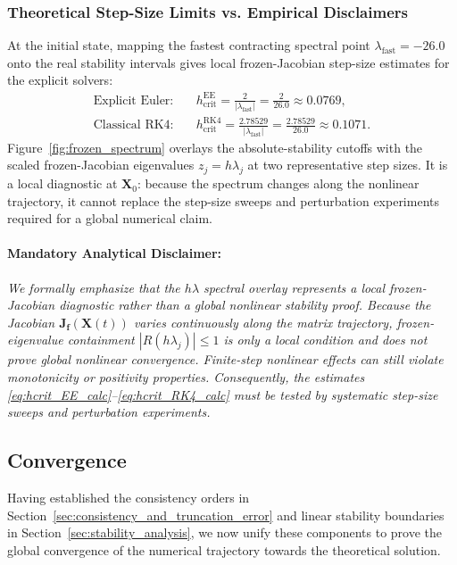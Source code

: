 \documentclass[11pt,a4paper]{article}
\theoremstyle{definition}
\theoremstyle{remark}
\begin{document}
\subsubsection{Theoretical Step-Size Limits vs. Empirical Disclaimers}
At the initial state, mapping the fastest contracting spectral point $\lambda_{\mathrm{fast}}=-26.0$ onto the real stability intervals gives local frozen-Jacobian step-size estimates for the explicit solvers:
\begin{align}
\text{Explicit Euler:} \quad & h_{\mathrm{crit}}^{\mathrm{EE}} = \frac{2}{|\lambda_{\mathrm{fast}}|} = \frac{2}{26.0} \approx 0.0769, \label{eq:hcrit_EE_calc} \\
\text{Classical RK4:} \quad & h_{\mathrm{crit}}^{\mathrm{RK4}} = \frac{2.78529}{|\lambda_{\mathrm{fast}}|} = \frac{2.78529}{26.0} \approx 0.1071. \label{eq:hcrit_RK4_calc}
\end{align}
Figure~\ref{fig:frozen_spectrum} overlays the absolute-stability cutoffs
with the scaled frozen-Jacobian eigenvalues $z_j=h\lambda_j$ at two
representative step sizes. It is a local diagnostic at $\mathbf{X}_0$:
because the spectrum changes along the nonlinear trajectory, it cannot
replace the step-size sweeps and perturbation experiments required for a
global numerical claim.

\paragraph{Mandatory Analytical Disclaimer:}
\emph{We formally emphasize that the $h\lambda$ spectral overlay represents a local frozen-Jacobian diagnostic rather than a global nonlinear stability proof. Because the Jacobian $\mathbf{J}_{\mathbf{f}}(\mathbf{X}(t))$ varies continuously along the matrix trajectory, frozen-eigenvalue containment $|R(h\lambda_j)| \le 1$ is only a local condition and does not prove global nonlinear convergence. Finite-step nonlinear effects can still violate monotonicity or positivity properties. Consequently, the estimates \eqref{eq:hcrit_EE_calc}--\eqref{eq:hcrit_RK4_calc} must be tested by systematic step-size sweeps and perturbation experiments.}

\subsection{Convergence}

\label{sec:convergence}

Having established the consistency orders in Section~\ref{sec:consistency_and_truncation_error} and linear stability boundaries in Section~\ref{sec:stability_analysis}, we now unify these components to prove the global convergence of the numerical trajectory towards the theoretical solution.
\end{document}
